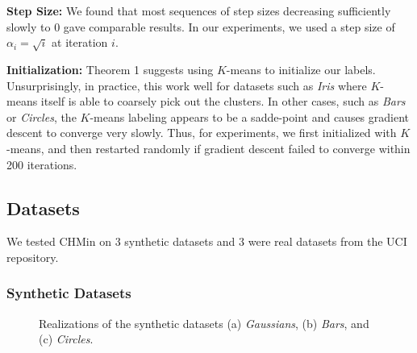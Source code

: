 \documentclass{article} %
\begin{document}
{\bf Step Size:} We found that most sequences of step sizes decreasing
sufficiently slowly to $0$ gave comparable results. In our experiments, we used
a step size of $\alpha_i = \sqrt{i}$ at iteration $i$.

{\bf Initialization:} Theorem 1 suggests using $K$-means to initialize our
labels. Unsurprisingly, in practice, this work well for datasets such as
\emph{Iris} where $K$-means itself is able to coarsely pick out the clusters.
In other cases, such as \emph{Bars} or \emph{Circles}, the $K$-means
labeling appears to be a sadde-point and causes gradient descent to converge
very slowly. Thus, for experiments, we first initialized with $K$-means,
and then restarted randomly if gradient descent failed to converge within
200 iterations.

\subsection{Datasets}
We tested CHMin on $3$ synthetic datasets and $3$ were real datasets from the
UCI repository.

\subsubsection{Synthetic Datasets}
\begin{figure}[h!]
\centering
{}
\caption{Realizations of the synthetic datasets (a) \emph{Gaussians}, (b)
\emph{Bars}, and (c) \emph{Circles}.}
\label{fig:synth_dat}
\end{figure}
\end{document}

